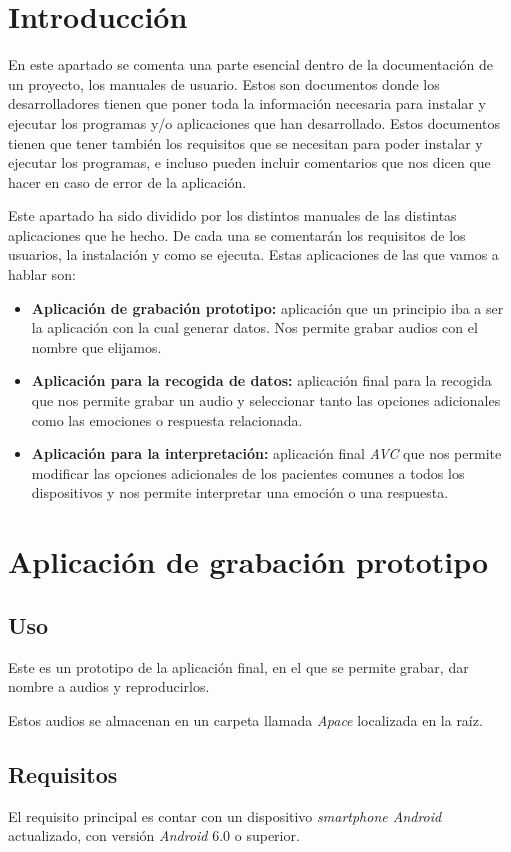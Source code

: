 
\section{Introducción}
En este apartado se comenta una parte esencial dentro de la documentación de un proyecto, los manuales de usuario. Estos son documentos donde los desarrolladores tienen que poner toda la información necesaria para instalar y ejecutar los programas y/o aplicaciones que han desarrollado. Estos documentos tienen que tener también los requisitos que se necesitan para poder instalar y ejecutar los programas, e incluso pueden incluir comentarios que nos dicen que hacer en caso de error de la aplicación.

Este apartado ha sido dividido por los distintos manuales de las distintas aplicaciones que he hecho. De cada una se comentarán los requisitos de los usuarios, la instalación y como se ejecuta. Estas aplicaciones de las que vamos a hablar son:
\begin{itemize}
	\item \textbf{Aplicación de grabación prototipo:} aplicación que un principio iba a ser la aplicación con la cual generar datos. Nos permite grabar audios con el nombre que elijamos.
	\item \textbf{Aplicación para la recogida de datos:} aplicación final para la recogida que nos permite grabar un audio y seleccionar tanto las opciones adicionales como las emociones o respuesta relacionada.
	\item \textbf{Aplicación para la interpretación:} aplicación final \textit{AVC} que nos permite modificar las opciones adicionales de los pacientes comunes a todos los dispositivos y nos permite interpretar una emoción o una respuesta.
\end{itemize}
\section{Aplicación de grabación prototipo}
\subsection{Uso}
Este es un prototipo de la aplicación final, en el que se permite grabar, dar nombre a audios y reproducirlos.

Estos audios se almacenan en un carpeta llamada \textit{Apace} localizada en la raíz.

\subsection{Requisitos}
El requisito principal es contar con un dispositivo \textit{smartphone Android} actualizado, con versión \textit{Android} 6.0 o superior.

